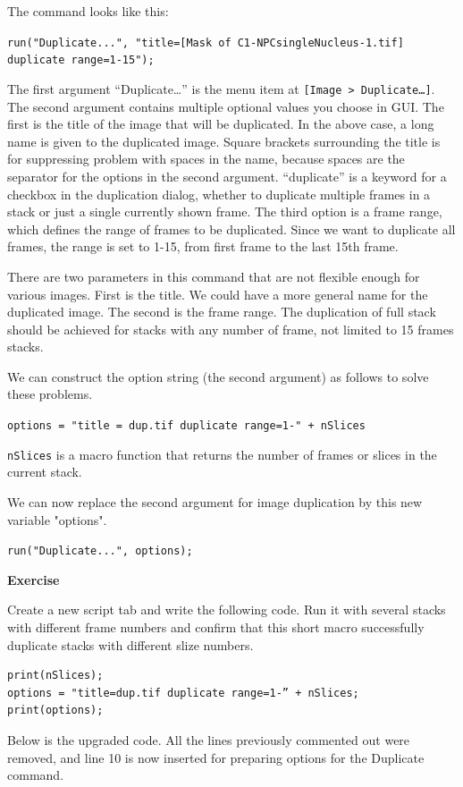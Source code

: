 \documentclass[11pt,a4paper,oneside]{report}
\newenvironment{indentexercise}[1]
{{\setlength{\leftmargin}{2em}}
\textbf{Exercise \thesubsection-#1}
\begin{list}{}
	\item
}
{\end{list}}
\newcommand{\ijmenu}[1]{\texttt{\small#1}}
\newcommand{\ilcom}[1]{\texttt{\small#1}}
\begin{document}
The command looks like this:

\ilcom{run("Duplicate...", "title=[Mask of C1-NPCsingleNucleus-1.tif] duplicate range=1-15");}

The first argument ``Duplicate\ldots'' is the menu item at \ijmenu{[Image > Duplicate\ldots]}. The second argument contains multiple optional values you choose in GUI. The first is the title of the image that will be duplicated. In the above case, a long name is given to the duplicated image. Square brackets surrounding the title is for suppressing problem with spaces in the name, because spaces are the separator for the options in the second argument. ``duplicate'' is a keyword for a checkbox in the duplication dialog, whether to duplicate multiple frames in a stack or just a single currently shown frame. The third option is a frame range, which defines the range of frames to be duplicated. Since we want to duplicate all frames, the range is set to 1-15, from first frame to the last 15th frame.

There are two parameters in this command that are not flexible enough for various images. First is the title. We could have a more general name for the duplicated image. The second is the frame range.  The duplication of full stack should be achieved for stacks with any number of frame, not limited to 15 frames stacks. 

We can construct the option string (the second argument) as follows to solve these problems. 

\ilcom{options = "title = dup.tif duplicate range=1-" + nSlices}

\ilcom{nSlices} is a macro function that returns the number of frames or slices in the current stack. 

We can now replace the second argument for image duplication by this new variable "options". 

\ilcom{run("Duplicate...", options);}

\begin{indentexercise}{2}
Create a new script tab and write the following code. Run it with several stacks with different frame numbers and confirm that this short macro successfully duplicate stacks with different slize numbers. 
\begin{lstlisting}
print(nSlices);
options = "title=dup.tif duplicate range=1-” + nSlices;
print(options);
\end{lstlisting}
\end{indentexercise}

Below is the upgraded code. All the lines previously commented out were removed, and line 10 is now inserted for preparing options for the Duplicate command. 
\end{document}
